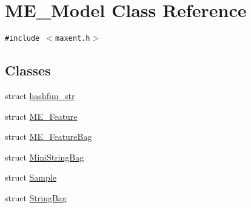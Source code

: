 \hypertarget{classME__Model}{
\section{ME\_\-Model Class Reference}
\label{classME__Model}
}
{\tt \#include $<$maxent.h$>$}

\subsection*{Classes}
\begin{CompactItemize}
\item 
struct \hyperlink{structME__Model_1_1hashfun__str}{hashfun\_\-str}
\item 
struct \hyperlink{structME__Model_1_1ME__Feature}{ME\_\-Feature}
\item 
struct \hyperlink{structME__Model_1_1ME__FeatureBag}{ME\_\-FeatureBag}
\item 
struct \hyperlink{structME__Model_1_1MiniStringBag}{MiniStringBag}
\item 
struct \hyperlink{structME__Model_1_1Sample}{Sample}
\item 
struct \hyperlink{structME__Model_1_1StringBag}{StringBag}
\end{CompactItemize}
